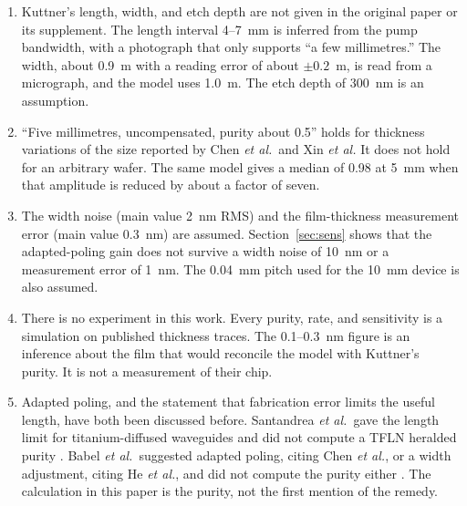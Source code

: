 \documentclass[11pt,a4paper]{article}
\begin{document}
\begin{enumerate}
\item Kuttner's length, width, and etch depth are not given in the original paper or its supplement.
The length interval 4--7~mm is inferred from the pump bandwidth, with a photograph that only supports ``a few millimetres.''
The width, about 0.9~\textmu m with a reading error of about $\pm 0.2$~\textmu m, is read from a micrograph, and the model uses 1.0~\textmu m.
The etch depth of 300~nm is an assumption.
\item ``Five millimetres, uncompensated, purity about 0.5'' holds for thickness variations of the size reported by Chen \emph{et al.}\ and Xin \emph{et al.}
It does not hold for an arbitrary wafer.
The same model gives a median of 0.98 at 5~mm when that amplitude is reduced by about a factor of seven.
\item The width noise (main value 2~nm RMS) and the film-thickness measurement error (main value 0.3~nm) are assumed.
Section~\ref{sec:sens} shows that the adapted-poling gain does not survive a width noise of 10~nm or a measurement error of 1~nm.
The 0.04~mm pitch used for the 10~mm device is also assumed.
\item There is no experiment in this work.
Every purity, rate, and sensitivity is a simulation on published thickness traces.
The 0.1--0.3~nm figure is an inference about the film that would reconcile the model with Kuttner's purity.
It is not a measurement of their chip.
\item Adapted poling, and the statement that fabrication error limits the useful length, have both been discussed before.
Santandrea \emph{et al.}\ gave the length limit for titanium-diffused waveguides and did not compute a TFLN heralded purity \cite{Santandrea2019}.
Babel \emph{et al.}\ suggested adapted poling, citing Chen \emph{et al.}, or a width adjustment, citing He \emph{et al.}, and did not compute the purity either \cite{Babel2025,He2024}.
The calculation in this paper is the purity, not the first mention of the remedy.
\end{enumerate}
\end{document}
